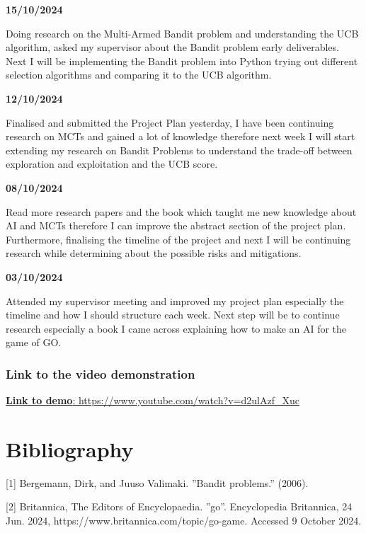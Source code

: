 \documentclass[]{final_report}
\begin{document}
\textbf{15/10/2024}

Doing research on the Multi-Armed Bandit problem and understanding the UCB algorithm, asked my supervisor about the Bandit problem early deliverables.  
Next I will be implementing the Bandit problem into Python trying out different selection algorithms and comparing it to the UCB algorithm.  

\newline

\textbf{12/10/2024}

Finalised and submitted the Project Plan yesterday, I have been continuing research on MCTs and gained a lot of knowledge therefore next week I will start
extending my research on Bandit Problems to understand the trade-off between exploration and exploitation and the UCB score.  

\textbf{08/10/2024}

Read more research papers and the book which taught me new knowledge about AI and MCTs therefore I can improve the abstract section of the project plan.
Furthermore, finalising the timeline of the project and next I will be continuing research while determining about the possible risks and mitigations.  

\textbf{03/10/2024}

Attended my supervisor meeting and improved my project plan especially the timeline and how I should structure each week.
Next step will be to continue research especially a book I came across explaining how to make an AI for the game of GO.  


\subsection{Link to the video demonstration}

\href{https://www.youtube.com/watch?v=d2ulAzf_Xuc}{\textbf{Link to demo}: https://www.youtube.com/watch?v=d2ulAzf_Xuc}


\newpage
\chapter{Bibliography}

[1] Bergemann, Dirk, and Juuso Valimaki. ”Bandit problems.” (2006).\newline

[2] Britannica, The Editors of Encyclopaedia. ”go”. Encyclopedia Britannica, 24 Jun. 2024,
https://www.britannica.com/topic/go-game. Accessed 9 October 2024.\newline
\end{document}
